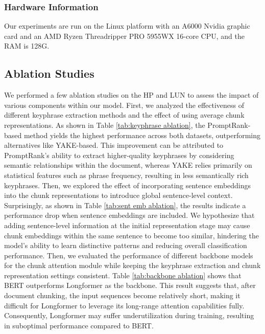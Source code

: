\documentclass[11pt]{article}
\begin{document}
\subsubsection{Hardware Information}
Our experiments are run on the Linux platform with an A6000 Nvidia graphic card and an AMD Ryzen Threadripper PRO 5955WX 16-core CPU, and the RAM is 128G.



\subsection{Ablation Studies}
\label{app:ablation study}

We performed a few ablation studies on the HP and LUN  to assess the impact of various components within our model. First, we analyzed the effectiveness of different keyphrase extraction methods and the effect of using average chunk representations. As shown in Table \ref{tab:keyphrase ablation}, the PromptRank-based method yields the highest performance across both datasets, outperforming alternatives like YAKE-based. This improvement can be attributed to PromptRank’s ability to extract higher-quality keyphrases by considering semantic relationships within the document, whereas YAKE relies primarily on statistical features such as phrase frequency, resulting in less semantically rich keyphrases. 
Then, we explored the effect of incorporating sentence embeddings into the chunk representations to introduce global sentence-level context. Surprisingly, as shown in Table \ref{tab:sent emb ablation}, the results indicate a performance drop when sentence embeddings are included. We hypothesize that adding sentence-level information at the initial representation stage may cause chunk embeddings within the same sentence to become too similar, hindering the model’s ability to learn distinctive patterns and reducing overall classification performance.
Then, we evaluated the performance of different backbone models for the chunk attention module while keeping the keyphrase extraction and chunk representation settings consistent. Table \ref{tab:backbone ablation} shows that BERT outperforms Longformer as the backbone. This result suggests that, after document chunking, the input sequences become relatively short, making it difficult for Longformer to leverage its long-range attention capabilities fully. Consequently, Longformer may suffer underutilization during training, resulting in suboptimal performance compared to BERT. 
\end{document}
